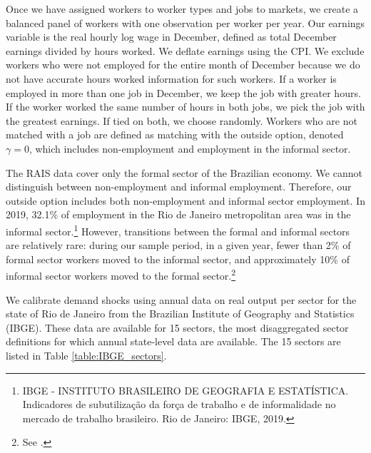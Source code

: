\documentclass[12pt]{article}
\def\g{\gamma}
\theoremstyle{definition}
\theoremstyle{plain}
\begin{document}
Once we have assigned workers to worker types and jobs to markets, we create a balanced panel of workers with one observation per worker per year. Our earnings variable is the real hourly log wage in December, defined as total December earnings divided by hours worked. We deflate earnings using the CPI. We exclude workers who were not employed for the entire month of December because we do not have accurate hours worked information for such workers. If a worker is employed in more than one job in December, we keep the job with greater hours. If the worker worked the same number of hours in both jobs, we pick the job with the greatest earnings. If tied on both, we choose randomly. Workers who are not matched with a job are defined as matching with the outside option, denoted $\g=0$, which includes non-employment and employment in the informal sector. 


The RAIS data  cover only the formal sector of the Brazilian economy. We cannot distinguish between non-employment and informal employment. Therefore, our outside option includes both non-employment and informal sector employment.  In 2019, 32.1\% of employment in the Rio de Janeiro metropolitan area was in the informal sector.\footnote{IBGE - INSTITUTO BRASILEIRO DE GEOGRAFIA E ESTATÍSTICA. Indicadores de subutilização da força de trabalho e de informalidade no mercado de trabalho brasileiro. Rio de Janeiro: IBGE, 2019.} However, transitions between the formal and informal sectors are relatively rare: during our sample period, in a given year, fewer than 2\% of formal sector workers moved to the informal sector, and approximately 10\% of informal sector workers moved to the formal sector.\footnote{See \citet[ Figure 21]{EngbomGonzagaMoserOlivieri2021}.}

We calibrate demand shocks using annual data on real output per sector for the state of Rio de Janeiro from the Brazilian Institute of Geography and Statistics  (IBGE). These data are available for 15 sectors, the most disaggregated sector definitions for which annual state-level data are available. The 15 sectors are listed in Table \ref{table:IBGE_sectors}. 

\end{document}
